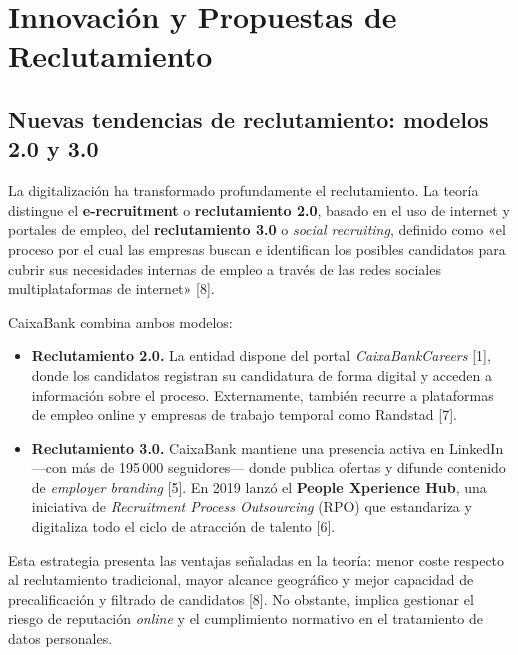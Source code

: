 
\section{Innovación y Propuestas de Reclutamiento}

\subsection{Nuevas tendencias de reclutamiento: modelos 2.0 y 3.0}

La digitalización ha transformado profundamente el reclutamiento. La teoría distingue el
\textbf{e-recruitment} o \textbf{reclutamiento 2.0}, basado en el uso de internet y portales
de empleo, del \textbf{reclutamiento 3.0} o \textit{social recruiting}, definido como «el
proceso por el cual las empresas buscan e identifican los posibles candidatos para cubrir
sus necesidades internas de empleo a través de las redes sociales multiplataformas de
internet» [8].

CaixaBank combina ambos modelos:

\begin{itemize}
  \item \textbf{Reclutamiento 2.0.} La entidad dispone del portal \textit{CaixaBankCareers}
        [1], donde los candidatos registran su candidatura de forma digital y acceden a
        información sobre el proceso. Externamente, también recurre a plataformas de empleo
        online y empresas de trabajo temporal como Randstad [7].

  \item \textbf{Reclutamiento 3.0.} CaixaBank mantiene una presencia activa en LinkedIn
        —con más de 195\,000 seguidores— donde publica ofertas y difunde contenido de
        \textit{employer branding} [5]. En 2019 lanzó el \textbf{People Xperience Hub},
        una iniciativa de \textit{Recruitment Process Outsourcing} (RPO) que estandariza
        y digitaliza todo el ciclo de atracción de talento [6].
\end{itemize}

Esta estrategia presenta las ventajas señaladas en la teoría: menor coste respecto al
reclutamiento tradicional, mayor alcance geográfico y mejor capacidad de precalificación
y filtrado de candidatos [8]. No obstante, implica gestionar el riesgo de reputación
\textit{online} y el cumplimiento normativo en el tratamiento de datos personales.

